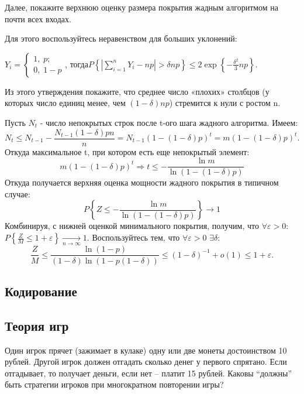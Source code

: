 \begin{problem}
\noindent Далее, покажите верхнюю оценку размера покрытия жадным алгоритмом на почти всех входах.

\noindent Для этого воспользуйтесь неравенством для больших уклонений:

\noindent $Y_{i} =\left\{\begin{array}{l} {1,\; p;} \\ {0,\; 1-p} \end{array}\right. $, тогда$P\left\{\left|\sum _{i=1}^{n}Y_{i}  -np\right|>\delta np\right\}\le 2\exp \left\{-\frac{\delta ^{2} }{3} np\right\}$.

\noindent Из этого утверждения покажите, что среднее число «плохих» столбцов (у которых число единиц менее, чем $(1-\delta )np$) стремится к нули с ростом n.

\noindent Пусть $N_{t} $ - число непокрытых строк после t-ого шага жадного алгоритма. Имеем:
\[N_{t} \le N_{t-1} -\frac{N_{t-1} (1-\delta )pn}{n} =N_{t-1} (1-(1-\delta )p)^{t} =m(1-(1-\delta )p)^{t} .\] 
Откуда максимальное t, при котором есть еще непокрытый элемент:
\[m(1-(1-\delta )p)^{t} \Rightarrow t\le -\frac{\ln m}{\ln (1-(1-\delta )p)} \] 
Откуда получается верхняя оценка мощности жадного покрытия в типичном случае:
\[P\left\{Z\le -\frac{\ln m}{\ln (1-(1-\delta )p)} \right\}\to 1\] 
Комбинируя, с нижней оценкой минимального покрытия, получим, что $\forall \varepsilon >0:$$P\left\{\frac{Z}{M} \le 1+\varepsilon \right\}\mathop{\to }\limits_{n\to \infty } 1$. Воспользуйтесь тем, что $\forall \varepsilon >0$ $\exists \delta :$
\[\frac{Z}{M} \le \frac{\ln (1-p)}{(1-\delta )\ln (1-p(1-\delta ))} \le (1-\delta )^{-1} +o(1)\le 1+\varepsilon .\] 

\end{problem}




\subsection{Кодирование}
\subsection{Теория игр}
\begin{problem}
Один игрок прячет (зажимает в кулаке) одну или две монеты достоинством 10 рублей. Другой игрок должен отгадать сколько денег у первого спрятано. Если отгадывает, то получает деньги, если нет -- платит 15 рублей. Каковы ``должны'' быть стратегии игроков при многократном повторении игры?

\end{problem}